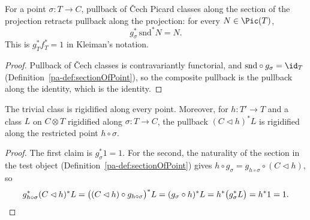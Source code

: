 \begin{lemma}
  \label{pa-lem:cechPicMap_sectionOfPoint_snd}
  \leanok

  For a point \(\sigma \colon T \to C\), pullback of \v Cech Picard classes along the section
  of the projection retracts pullback along the projection: for every \(N \in \Pic(T)\),
  \[
    g_\sigma^{*}\,\mathrm{snd}^{*} N = N .
  \]
  This is \(g_T^{*} f_T^{*} = 1\) in Kleiman's notation.
\end{lemma}
\begin{proof}
  \leanok
  Pullback of \v Cech classes is contravariantly functorial, and \(\mathrm{snd} \circ
  g_\sigma = \id_T\) (Definition~\ref{pa-def:sectionOfPoint}), so the composite pullback is the
  pullback along the identity, which is the identity.
\end{proof}

\begin{lemma}
  \label{pa-lem:isRigidified_cechPicMap}
  \leanok

  The trivial class is rigidified along every point. Moreover, for \(h \colon T' \to T\) and a
  class \(L\) on \(C \otimes T\) rigidified along \(\sigma \colon T \to C\), the pullback
  \((C \lhd h)^{*} L\) is rigidified along the restricted point \(h \circ \sigma\).
\end{lemma}
\begin{proof}
  \leanok
  The first claim is \(g_\sigma^{*} 1 = 1\). For the second, the naturality of the section in
  the test object (Definition~\ref{pa-def:sectionOfPoint}) gives \(h \circ g_\sigma =
  g_{h \circ \sigma} \circ (C \lhd h)\), so
  \[
    g_{h \circ \sigma}^{*} (C \lhd h)^{*} L
      = \bigl((C \lhd h) \circ g_{h \circ \sigma}\bigr)^{*} L
      = (g_\sigma \circ h)^{*} L
      = h^{*} \bigl(g_\sigma^{*} L\bigr) = h^{*} 1 = 1 . \qedhere
  \]
\end{proof}


